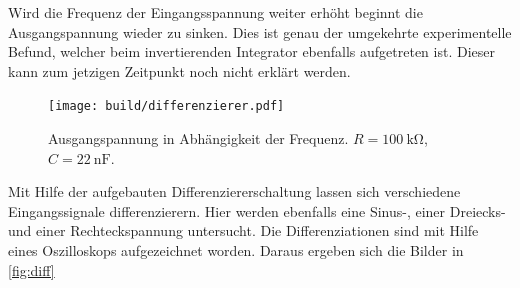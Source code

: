 Wird die Frequenz der Eingangsspannung weiter erhöht beginnt die Ausgangspannung
wieder zu sinken.
Dies ist genau der umgekehrte experimentelle Befund, welcher beim invertierenden Integrator
ebenfalls aufgetreten ist.
Dieser kann zum jetzigen Zeitpunkt noch nicht erklärt werden.
\begin{figure}
    \centering
    \texttt{[image: build/differenzierer.pdf]}
    \caption{Ausgangspannung in Abhängigkeit der Frequenz. $R = \SI{100}{\kilo\ohm}$,
        $C = \SI{22}{\nano\farad}$.}
    \label{fig:differenzierer}
\end{figure}
\FloatBarrier
Mit Hilfe der aufgebauten Differenziererschaltung lassen sich verschiedene Eingangssignale 
differenzierern. 
Hier werden ebenfalls eine Sinus-, einer Dreiecks- und einer Rechteckspannung 
untersucht.
Die Differenziationen sind mit Hilfe eines Oszilloskops aufgezeichnet worden.
Daraus ergeben sich die Bilder in \autoref{fig:diff}
